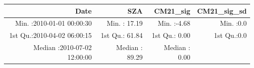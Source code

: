 \documentclass[
  10pt,
  a4paper,oneside]{article}
\begin{document}
\begin{longtable}[]{@{}rrrr@{}}
\toprule
\begin{minipage}[b]{0.34\columnwidth}\raggedleft
Date\strut
\end{minipage} & \begin{minipage}[b]{0.19\columnwidth}\raggedleft
SZA\strut
\end{minipage} & \begin{minipage}[b]{0.18\columnwidth}\raggedleft
CM21\_sig\strut
\end{minipage} & \begin{minipage}[b]{0.18\columnwidth}\raggedleft
CM21\_sig\_sd\strut
\end{minipage}\tabularnewline
\midrule
\endhead
\begin{minipage}[t]{0.34\columnwidth}\raggedleft
Min. :2010-01-01 00:00:30\strut
\end{minipage} & \begin{minipage}[t]{0.19\columnwidth}\raggedleft
Min. : 17.19\strut
\end{minipage} & \begin{minipage}[t]{0.18\columnwidth}\raggedleft
Min. :-4.68\strut
\end{minipage} & \begin{minipage}[t]{0.18\columnwidth}\raggedleft
Min. :0.0\strut
\end{minipage}\tabularnewline
\begin{minipage}[t]{0.34\columnwidth}\raggedleft
1st Qu.:2010-04-02 06:00:15\strut
\end{minipage} & \begin{minipage}[t]{0.19\columnwidth}\raggedleft
1st Qu.: 61.84\strut
\end{minipage} & \begin{minipage}[t]{0.18\columnwidth}\raggedleft
1st Qu.: 0.00\strut
\end{minipage} & \begin{minipage}[t]{0.18\columnwidth}\raggedleft
1st Qu.:0.0\strut
\end{minipage}\tabularnewline
\begin{minipage}[t]{0.34\columnwidth}\raggedleft
Median :2010-07-02 12:00:00\strut
\end{minipage} & \begin{minipage}[t]{0.19\columnwidth}\raggedleft
Median : 89.29\strut
\end{minipage} & \begin{minipage}[t]{0.18\columnwidth}\raggedleft
Median : 0.00\strut
\end{minipage} & \begin{minipage}[t]{0.18\columnwidth}\raggedleft

\end{minipage}
\end{longtable}
\end{document}
